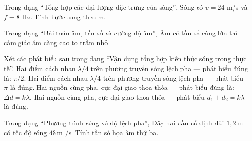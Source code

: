 \begin{ex}
Trong dạng “Tổng hợp các đại lượng đặc trưng của sóng”, Sóng có $v=24$ m/s và $f=8$ Hz. Tính bước sóng theo m.
\end{ex}

\begin{ex}
Trong dạng “Bài toán âm, tần số và cường độ âm”, Âm có tần số càng lớn thì cảm giác âm càng
\choice
{\True cao}
{to}
{trầm}
{nhỏ}
\end{ex}

\begin{ex}
Xét các phát biểu sau trong dạng “Vận dụng tổng hợp kiến thức sóng trong thực tế”.
\choiceTF
{\True Hai điểm cách nhau $\lambda/4$ trên phương truyền sóng lệch pha — phát biểu đúng là: $\pi/2$.}
{Hai điểm cách nhau $\lambda/4$ trên phương truyền sóng lệch pha — phát biểu $\pi$ là đúng.}
{\True Hai nguồn cùng pha, cực đại giao thoa thỏa — phát biểu đúng là: $\Delta d=k\lambda$.}
{Hai nguồn cùng pha, cực đại giao thoa thỏa — phát biểu $d_1+d_2=k\lambda$ là đúng.}
\end{ex}

\begin{bt}
Trong dạng “Phương trình sóng và độ lệch pha”, Dây hai đầu cố định dài $1,2\,\text{m}$ có tốc độ sóng $48\,\text{m}$ /s. Tính tần số họa âm thứ ba.
\end{bt}

